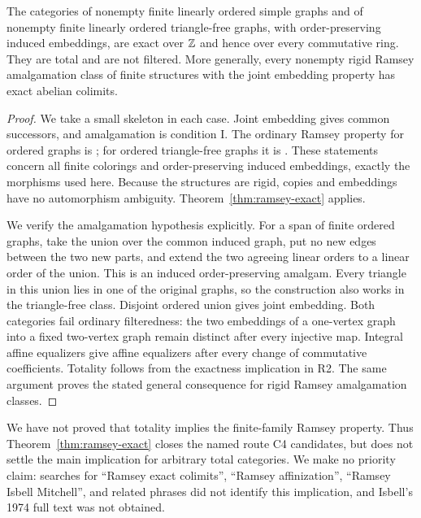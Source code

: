 \begin{corollary}
\label{cor:ordered-graphs-exact}
The categories of nonempty finite linearly ordered simple graphs and of
nonempty finite linearly ordered triangle-free graphs, with order-preserving
induced embeddings, are exact over $\mathbb Z$ and hence over every commutative
ring. They are total and are not filtered. More generally, every nonempty
rigid Ramsey amalgamation class of finite structures with the joint
embedding property has exact abelian colimits.
\end{corollary}
\begin{proof}
We take a small skeleton in each case. Joint embedding gives common
successors, and amalgamation is condition I. The ordinary Ramsey property
for ordered graphs is \citet[Corollary~4.3]{HubickaNesetril2019}; for ordered
triangle-free graphs it is \citet[Theorem~15]{Hubicka2025}.
These statements concern all finite colorings and order-preserving induced
embeddings, exactly the morphisms used here. Because the structures are
rigid, copies and embeddings have no automorphism ambiguity.
Theorem~\ref{thm:ramsey-exact} applies.

We verify the amalgamation hypothesis explicitly. For a span of finite
ordered graphs, take the union over the common induced graph, put no new
edges between the two new parts, and extend the two agreeing linear orders
to a linear order of the union. This is an induced order-preserving amalgam.
Every triangle in this union lies in one of the original graphs, so the
construction also works in the triangle-free class. Disjoint ordered union
gives joint embedding. Both categories fail ordinary filteredness: the two
embeddings of a one-vertex graph into a fixed two-vertex graph remain
distinct after every injective map. Integral affine equalizers give affine
equalizers after every change of commutative coefficients. Totality follows
from the exactness implication in R2. The same argument proves the stated
general consequence for rigid Ramsey amalgamation classes.
\end{proof}

\begin{remark}\label{C:ramsey-scope}
We have not proved that totality implies the finite-family Ramsey property.
Thus Theorem~\ref{thm:ramsey-exact} closes the named route C4 candidates,
but does not settle the main implication for arbitrary total categories.
We make no priority claim: searches for ``Ramsey exact colimits'',
``Ramsey affinization'', ``Ramsey Isbell Mitchell'', and related phrases
did not identify this implication, and Isbell's 1974 full text was not obtained.
\end{remark}
